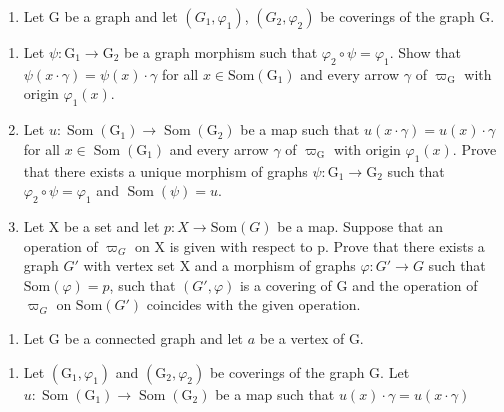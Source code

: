 \begin{enumerate}
\def\labelenumi{\arabic{enumi})}
\setcounter{enumi}{6}
\tightlist
\item
  Let G be a graph and let \((G_{1},\varphi_{1})\), \((G_{2},\varphi_{2})\) be coverings of the graph G.
\end{enumerate}

\begin{enumerate}
\def\labelenumi{\alph{enumi})}
\item
  Let \(\psi\colon\mathrm{G}_{1}\to\mathrm{G}_{2}\) be a graph morphism such that \(\varphi_{2}\circ\psi=\varphi_{1}\). Show that \(\psi(x\cdot\gamma)=\psi(x)\cdot\gamma\) for all \(x\in\mathrm{Som}(\mathrm{G}_{1})\) and every arrow \(\gamma\) of \(\varpi_{\mathrm{G}}\) with origin \(\varphi_{1}(x)\).
\item
  Let \(u \colon \operatorname{Som}(\mathrm{G}_1) \to \operatorname{Som}(\mathrm{G}_2)\) be a map such that \(u(x \cdot \gamma) = u(x) \cdot \gamma\) for all \(x \in \operatorname{Som}(\mathrm{G}_1)\) and every arrow \(\gamma\) of \(\varpi_{\mathrm{G}}\) with origin \(\varphi_1(x)\). Prove that there exists a unique morphism of graphs \(\psi \colon \mathrm{G}_1 \to \mathrm{G}_2\) such that \(\varphi_2 \circ \psi = \varphi_1\) and \(\operatorname{Som}(\psi) = u\).
\item
  Let X be a set and let \(p: X \to \text{Som}(G)\) be a map. Suppose that an operation of \(\varpi_{G}\) on X is given with respect to p. Prove that there exists a graph \(G'\) with vertex set X and a morphism of graphs \(\varphi: G' \to G\) such that \(\text{Som}(\varphi) = p\), such that \((G', \varphi)\) is a covering of G and the operation of \(\varpi_{G}\) on \(\text{Som}(G')\) coincides with the given operation.
\end{enumerate}

\begin{enumerate}
\def\labelenumi{\arabic{enumi})}
\setcounter{enumi}{7}
\tightlist
\item
  Let G be a connected graph and let \(a\) be a vertex of G.
\end{enumerate}

\begin{enumerate}
\def\labelenumi{\alph{enumi})}
\tightlist
\item
  Let \((\mathrm{G}_{1},\varphi_{1})\) and \((\mathrm{G}_{2},\varphi_{2})\) be coverings of the graph G. Let \(u\colon\operatorname{Som}(\mathrm{G}_{1})\to\operatorname{Som}(\mathrm{G}_{2})\) be a map such that \(u(x)\cdot\gamma=u(x\cdot\gamma)\)
\end{enumerate}

